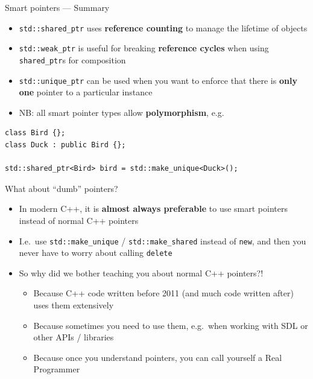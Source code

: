 \begin{frame}[fragile]{Smart pointers --- Summary}
    \begin{itemize}
        \item \lstinline{std::shared_ptr} uses \textbf{reference counting} to manage the lifetime
            of objects
        \item \lstinline{std::weak_ptr} is useful for breaking \textbf{reference cycles}
            when using \lstinline{shared_ptr}s for composition
        \item \lstinline{std::unique_ptr} can be used when you want to enforce that there is
            \textbf{only one} pointer to a particular instance
        \item NB: all smart pointer types allow \textbf{polymorphism}, e.g.
    \end{itemize}
    \begin{lstlisting}
class Bird {};
class Duck : public Bird {};

std::shared_ptr<Bird> bird = std::make_unique<Duck>();
    \end{lstlisting}
\end{frame}

\begin{frame}[fragile]{What about ``dumb'' pointers?}
    \begin{itemize}
        \item In modern C++, it is \textbf{almost always preferable} to use smart pointers
            instead of normal C++ pointers
        \item I.e.\ use \lstinline{std::make_unique} / \lstinline{std::make_shared} instead of
            \lstinline{new}, and then you never have to worry about calling \lstinline{delete}
        \item So why did we bother teaching you about normal C++ pointers?!
            \begin{itemize}
                \item Because C++ code written before 2011 (and much code written after) uses them extensively
                \item Because sometimes you need to use them,
                    e.g.\ when working with SDL or other APIs / libraries
                \item Because once you understand pointers, you can call yourself a Real Programmer \smiley
            \end{itemize}
    \end{itemize}
\end{frame}

